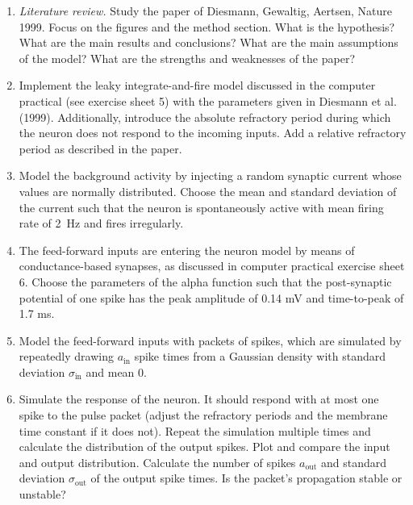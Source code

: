 \documentclass[12pt]{article}
\begin{document}
\begin{enumerate}
    \item \textit{Literature review.} Study the paper of Diesmann, Gewaltig,
        Aertsen, Nature 1999. Focus on the figures and the method
        section. What is the hypothesis? What are the main results
        and conclusions? What are the main assumptions of the model?
        What are the strengths and weaknesses of the paper?

    \item Implement the leaky integrate-and-fire model discussed in
        the computer practical (see exercise sheet 5) with the parameters given
        in Diesmann et al. (1999). Additionally, introduce the absolute
        refractory period during which the neuron does not respond to
        the incoming inputs. %
        Add a relative refractory
        period as described in the paper.


    \item Model the background activity by injecting a random synaptic
        current whose values are normally distributed. Choose the mean
        and standard deviation of the current such that the neuron is
        spontaneously active with mean firing rate of 2~Hz and fires
        irregularly.

    \item The feed-forward inputs are entering the neuron model by
        means of conductance-based synapses, as discussed in computer
        practical exercise sheet 6. Choose the parameters of the alpha
        function such that the post-synaptic potential of one spike has
        the peak amplitude of 0.14 mV and time-to-peak of 1.7 ms.

    \item Model the feed-forward inputs with packets of spikes, which
        are simulated by repeatedly drawing $a_\mathrm{in}$ spike times
        from a Gaussian density with standard deviation
        $\sigma_\mathrm{in}$ and mean 0.

    \item Simulate the response of the neuron. It should respond with at
        most one spike to the pulse packet (adjust the refractory
        periods and the membrane time constant if it does not). Repeat the
        simulation multiple times and calculate the distribution of
        the output spikes. Plot and compare the input and output
        distribution.  Calculate the number of spikes $a_\mathrm{out}$ and
        standard deviation $\sigma_\mathrm{out}$ of the output spike times.
        Is the packet's propagation stable or unstable?


\end{enumerate}
\end{document}
